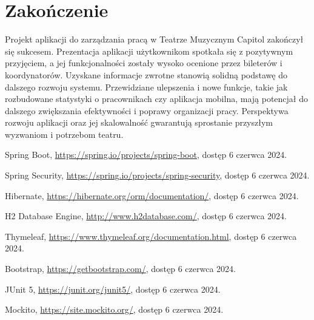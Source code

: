 \documentclass[shortabstract]{iithesis}
\begin{document}
\section{Zakończenie}

Projekt aplikacji do zarządzania pracą w Teatrze Muzycznym Capitol zakończył się sukcesem. Prezentacja aplikacji użytkownikom spotkała się z pozytywnym przyjęciem, a jej funkcjonalności zostały wysoko ocenione przez bileterów i koordynatorów. Uzyskane informacje zwrotne stanowią solidną podstawę do dalszego rozwoju systemu. Przewidziane ulepszenia i nowe funkcje, takie jak rozbudowane statystyki o pracownikach czy aplikacja mobilna, mają potencjał do dalszego zwiększania efektywności i poprawy organizacji pracy. Perspektywa rozwoju aplikacji oraz jej skalowalność gwarantują sprostanie przyszłym wyzwaniom i potrzebom teatru.


\begin{thebibliography}{8}
Spring Boot, \url{https://spring.io/projects/spring-boot}, dostęp 6 czerwca 2024.

Spring Security, \url{https://spring.io/projects/spring-security}, dostęp 6 czerwca 2024.

Hibernate, \url{https://hibernate.org/orm/documentation/}, dostęp 6 czerwca 2024.

H2 Database Engine, \url{http://www.h2database.com/}, dostęp 6 czerwca 2024.

Thymeleaf, \url{https://www.thymeleaf.org/documentation.html}, dostęp 6 czerwca 2024.

Bootstrap, \url{https://getbootstrap.com/}, dostęp 6 czerwca 2024.

JUnit 5, \url{https://junit.org/junit5/}, dostęp 6 czerwca 2024.

Mockito, \url{https://site.mockito.org/}, dostęp 6 czerwca 2024.

\end{thebibliography}
\end{document}
